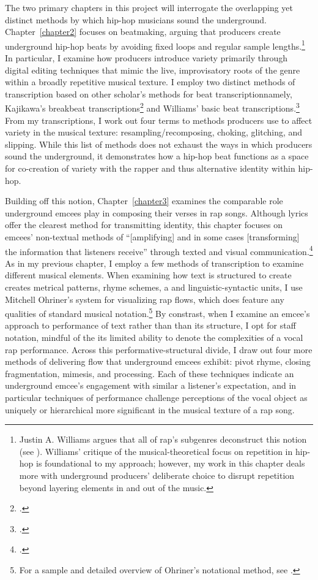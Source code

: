 The two primary chapters in this project will interrogate the overlapping yet distinct methods 
by which hip-hop musicians sound the underground. Chapter~\ref{chapter2} focuses on beatmaking,
arguing that producers create underground hip-hop beats by avoiding fixed loops and regular 
sample lengths.\footnote{
    Justin A. Williams argues that all of rap's subgenres deconstruct this notion 
    (see \cite{justinawilliamsBeatsFlowsResponse2009}). Williams' critique of the musical-theoretical
    focus on repetition in hip-hop is foundational to my approach; however, my work in this chapter 
    deals more with underground producers' deliberate choice to disrupt repetition beyond layering
    elements in and out of the music.} 
In particular, I examine how producers introduce variety primarily through digital editing 
techniques that mimic the live, improvisatory roots of the genre within a broadly repetitive 
musical texture. I employ two distinct methods of transcription based on other scholar's methods
for beat transcription\textemdash namely, Kajikawa's breakbeat transcriptions\footnote{
    \autocite[29--30 and 36--37]{lorenkajikawaSoundingRaceRap2015}.} 
and Williams' basic beat transcriptions.\footnote{
    \autocite[61ff]{justinawilliamsRhyminStealinMusical2013}.} 
From my transcriptions, I work out four terms to methods producers use to affect variety in 
the musical texture: resampling/recomposing, choking, glitching, and slipping. While this list 
of methods does not exhaust the ways in which producers sound the underground, it demonstrates how 
a hip-hop beat functions as a space for co-creation of variety with the rapper and thus alternative
identity within hip-hop.

Building off this notion, Chapter~\ref{chapter3} examines the comparable role underground emcees play
in composing their verses in rap songs. Although lyrics offer the clearest method for transmitting 
identity, this chapter focuses on emcees' non-textual methods of ``[amplifying] and in some cases 
[transforming] the information that listeners receive'' through texted and visual 
communication.\footnote{
    \autocite[12]{lorenkajikawaSoundingRaceRap2015}.} 
As in my previous chapter, I employ a few methods of transcription to examine different musical
elements. When examining how text is structured to create creates metrical patterns, rhyme schemes, a
and linguistic-syntactic units, I use Mitchell Ohriner's system for visualizing rap flows, which does
feature any qualities of standard musical notation.\footnote{
    For a sample and detailed overview of Ohriner's notational method, see 
    \autocite[xxvii--xl]{mitchellohrinerFlowRhythmicVoice2019}.}
By constrast, when I examine an emcee's approach to performance of text rather than than its structure,
I opt for staff notation, mindful of the its limited ability to denote the complexities of a vocal 
rap performance. Across this performative-structural divide, I draw out four more methods of delivering
flow that underground emcees exhibit: pivot rhyme, closing fragmentation, mimesis, and processing.
Each of these techniques indicate an underground emcee's engagement with similar a listener's expectation,
and in particular techniques of performance challenge perceptions of the vocal object as uniquely or
hierarchical more significant in the musical texture of a rap song.
